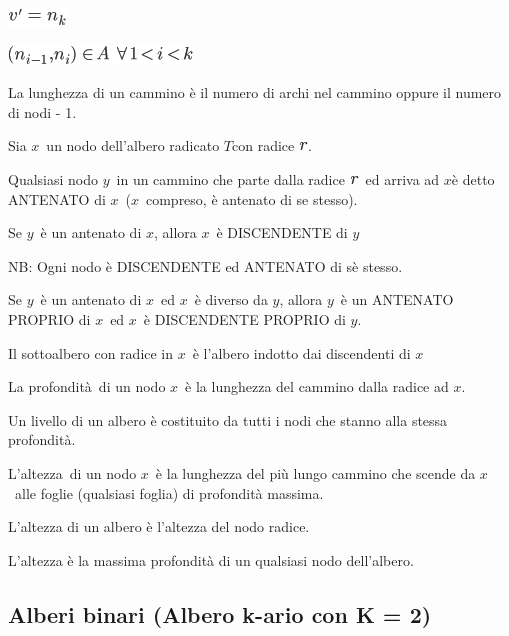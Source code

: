 \documentclass{article}
\begin{document}
\includegraphics{images/image80.png}

\includegraphics{images/image81.png}



{La lunghezza di un cammino è il numero di archi nel cammino oppure il
numero di nodi - 1.}

{}

{Sia }$x${~un nodo dell'albero radicato
}$T${con radice
}\includegraphics{images/image83.png}{.}

{Qualsiasi nodo }$y${~in un cammino che
parte dalla radice }\includegraphics{images/image83.png}{~ed arriva ad
}$x${è detto ANTENATO di
}$x${~(}$x${~compreso,
è antenato di se stesso).}

{}

{Se }$y${~è un antenato di
}$x${, allora
}$x${~è DISCENDENTE di
}$y$

{}

{NB: Ogni nodo è DISCENDENTE ed ANTENATO di sè stesso.}

{}

{Se }$y${~è un antenato di
}$x${~ed
}$x${~è diverso da
}$y${, allora
}$y${~è un ANTENATO PROPRIO di
}$x${~ed
}$x${~è DISCENDENTE PROPRIO di
}$y${.}

{Il sottoalbero con radice in }$x${~è
l'albero indotto dai discendenti di
}$x$

{La profondità}{~di un nodo }$x${~è la
lunghezza del cammino dalla radice ad
}$x${.}

{Un livello di un albero è costituito da tutti i nodi che stanno alla
stessa profondità. }

{L'altezza}{~di un nodo }$x${~è la
lunghezza del più lungo cammino che scende da
}$x${~alle foglie (qualsiasi foglia) di
profondità massima.}

{L'altezza di un albero è l'altezza del nodo radice.}

{L'altezza è la massima profondità di un qualsiasi nodo dell'albero.}

{}

\hypertarget{h.rmzlh8kpnju}{\subsection{\texorpdfstring{{Alberi binari
(Albero k-ario con K =
2)}}{Alberi binari (Albero k-ario con K = 2)}}\label{h.rmzlh8kpnju}}
\end{document}
